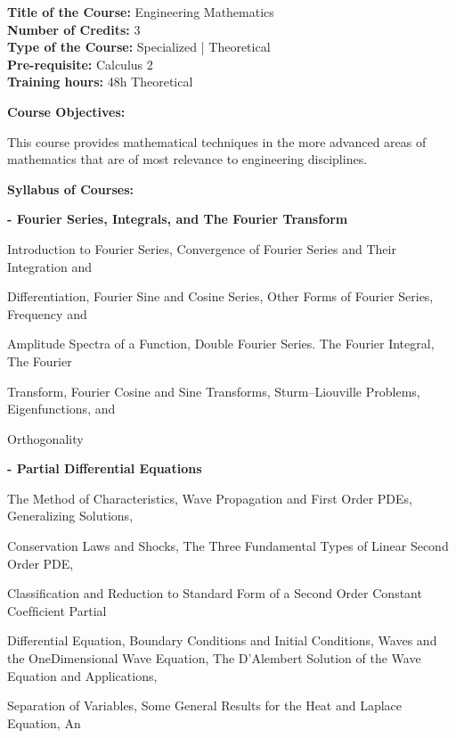 \documentclass[12pt,a4paper]{article}
\begin{document}
\newpage
\textbf{Title of the Course:} Engineering Mathematics\\
\textbf{Number of Credits:} 3\\
\textbf{Type of the Course:} Specialized | Theoretical\\
\textbf{Pre-requisite:} Calculus 2\\
\textbf{Training hours:} 48h Theoretical\par\vspace{4pt}
\textbf{Course Objectives:}\par\vspace{2pt}
This course provides mathematical techniques in the more advanced areas of mathematics that are
of most relevance to engineering disciplines.\par\vspace{4pt}
\textbf{Syllabus of Courses:}\par\vspace{2pt}
\vspace{2pt}\textbf{- Fourier Series, Integrals, and The Fourier Transform}\par
Introduction to Fourier Series, Convergence of Fourier Series and Their Integration and\par
Differentiation, Fourier Sine and Cosine Series, Other Forms of Fourier Series, Frequency and\par
Amplitude Spectra of a Function, Double Fourier Series. The Fourier Integral, The Fourier\par
Transform, Fourier Cosine and Sine Transforms, Sturm–Liouville Problems, Eigenfunctions, and\par
Orthogonality\par
\vspace{2pt}\textbf{- Partial Differential Equations}\par
The Method of Characteristics, Wave Propagation and First Order PDEs, Generalizing Solutions,\par
Conservation Laws and Shocks, The Three Fundamental Types of Linear Second Order PDE,\par
Classiﬁcation and Reduction to Standard Form of a Second Order Constant Coefﬁcient Partial\par
Differential Equation, Boundary Conditions and Initial Conditions, Waves and the OneDimensional Wave Equation, The D’Alembert Solution of the Wave Equation and Applications,\par
Separation of Variables, Some General Results for the Heat and Laplace Equation, An\par
\end{document}
